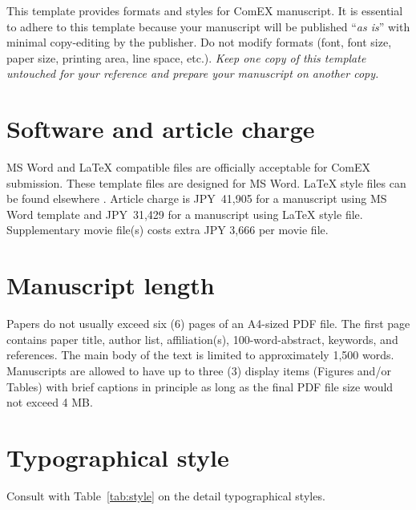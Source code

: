 \documentclass{comex}
\begin{document}
This template provides formats and styles for ComEX manuscript. It is
essential to adhere to this template because your manuscript will be
published ``{\it as is}'' with minimal copy-editing by the publisher. Do
not modify formats (font, font size, paper size, printing area, line
space, etc.).  {\it Keep one copy of this template untouched for your
reference and prepare your manuscript on another copy.}

\section{Software and article charge}

MS Word and \LaTeX{} compatible files are officially acceptable for
ComEX submission. These template files are designed for MS Word. \LaTeX{}
style files can be found elsewhere \cite{web_link}.  
Article charge is JPY~41,905 for a manuscript 
using MS Word template and JPY~31,429
for a manuscript using \LaTeX{} style file. 
Supplementary movie file(s) costs extra JPY 3,666 per movie file.

\section{Manuscript length}

Papers do not usually exceed six (6) pages of an A4-sized PDF file. The
first page contains paper title, author list, affiliation(s),
100-word-abstract, keywords, and references.  The main body of the text
is limited to approximately 1,500 words. Manuscripts are allowed to have
up to three (3) display items (Figures and/or Tables) with brief
captions in principle as long as the final PDF file size would not
exceed 4 MB. 

\section{Typographical style}

Consult with Table~\ref{tab:style} on the detail typographical styles.
\end{document}
